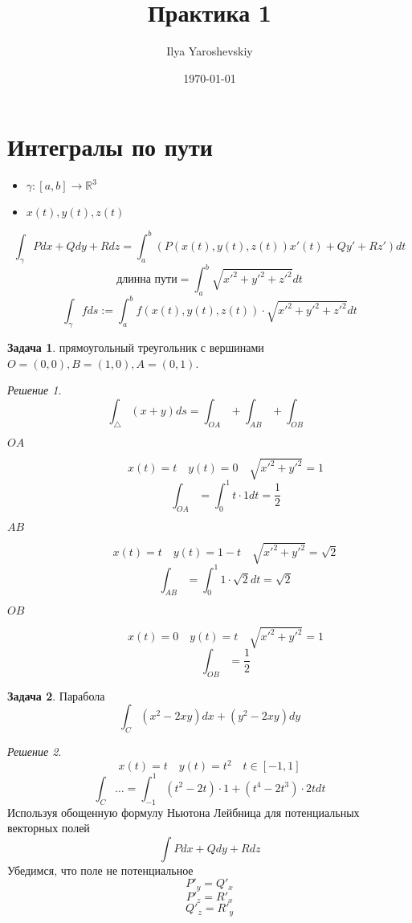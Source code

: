 \documentclass[english]{article}
\author{Ilya Yaroshevskiy}
\date{\today}
\title{Практика 1}
\newcommand{\R}{\mathbb{R}}
\theoremstyle{plain}
\theoremstyle{remark}
\newtheorem*{solution}{Решение}
\theoremstyle{definition}
\newtheorem{task}{Задача}
\begin{document}
\maketitle
\tableofcontents


\section{Интегралы по пути}
\label{sec:org9acdb84}
\begin{itemize}
\item \(\gamma: [a, b] \to \R^3\)
\item \(x(t), y(t), z(t)\)
\end{itemize}
\[ \int_\gamma P dx + Q dy + R dz = \int_a^b (P(x(t), y(t), z(t))x'(t) + Qy' + Rz') dt \]
\[ \text{длинна пути} = \int_a^b \sqrt{x'^2 + y'^2 + z'^2} dt \]
\[ \int_\gamma f ds := \int_a^b f(x(t), y(t), z(t)) \cdot \sqrt{x'^2 + y'^2 + z'^2} dt \]
\begin{task}
прямоугольный треугольник с вершинами \(O = (0,0), B = (1, 0), A = (0, 1)\).
\end{task}
\begin{solution}
\[ \int_\triangle (x + y) ds = \int_{OA} + \int_{AB} + \int_{OB} \]
\begin{description}
\item[{\(OA\)}] \[ x(t) = t\quad y(t) = 0\quad \sqrt{x'^2 + y'^2} = 1 \]
\[ \int_{OA} = \int_0^1 t\cdot 1 dt = \frac{1}{2} \]
\item[{\(AB\)}] \[ x(t) = t\quad y(t) = 1 - t\quad\sqrt{x'^2 + y'^2} = \sqrt{2} \]
\[ \int_{AB} = \int_0^1 1 \cdot \sqrt{2} dt = \sqrt{2} \]
\item[{\(OB\)}] \[ x(t) = 0\quad y(t) = t\quad\sqrt{x'^2 + y'^2} = 1 \]
\[ \int_{OB} = \frac{1}{2} \]
\end{description}
\end{solution}
\begin{task}
Парабола
\[ \int_C (x^2 - 2xy) dx + (y^2 - 2xy) dy \]
\end{task}
\begin{solution}
\[ x(t) = t \quad y(t) = t^2 \quad t \in[-1, 1] \]
\[ \int_C \dots = \int_{-1}^1 (t^2 - 2t)\cdot 1 + (t^4 - 2t^3)\cdot 2t dt \]
Используя обощенную формулу Ньютона Лейбница для потенциальных векторных полей
\[ \int P dx + Q dy + R dz \]
Убедимся, что поле не потенциальное
\[ P'_y = Q'_x \]
\[ P'_z = R'_x \]
\[ Q'_z = R'_y \]
\end{solution}
\end{document}
